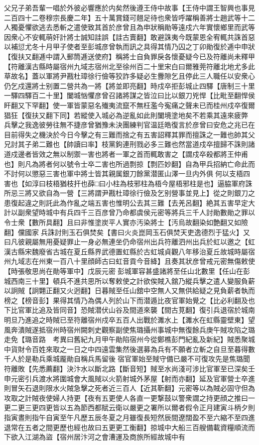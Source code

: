 父兄子弟吾輩一唱於外彼必響應於内矣然後遵王侍中故事【王侍中謂王智興也事見二百四十二卷穆宗長慶二年】五十萬賞錢可翹足待也衆皆呼躍稱善將士趙武等十二人獨憂懼欲逃去悉斬之遣使致其首於彦曾且為申狀稱勛等遠戍六年實懷鄉里而武等因衆心不安輒萌奸計將士誠知詿誤【詿古賣翻】敢避誅夷今既蒙恩全宥輒共誅首惡以補愆尤冬十月甲子使者至彭城彦曾執而訊之具得其情乃囚之丁卯勛復於逓中申狀【復扶又翻逓中謂入郵筒逓送使府】稱將士自負罪戾各懷憂疑今已及符離尚未釋甲【符離漢古縣時屬宿州九域志宿州北至徐州百二十里宋白曰爾雅莞符離北地尤多此草故名】蓋以軍將尹戡杜璋徐行儉等狡詐多疑必生釁隙乞且停此三人職任以安衆心仍乞戍還將士别置二營共為一將【將並即亮翻】時戍卒拒彭城止四驛【唐制三十里一驛四驛百二十里】闔城忷懼彦曾召諸將謀之皆泣曰比以銀刀兇悍【比毗至翻悍侯盰翻又下罕翻】使一軍皆蒙惡名殱夷流竄不無枉濫今寃痛之聲未已而桂州戍卒復爾猖狂【復扶又翻下同】若縱使入城必為逆亂如此則闔境塗地矣不若乘其遠來疲弊兵擊之我逸彼勞往無不捷彦曾猶豫未決團練判官温廷皓復言於彦曾曰安危之兆已在目前得失之機決於今日今擊之有三難而捨之有五害詔釋其罪而擅誅之一難也帥其父兄討其子弟二難也【帥讀曰率】枝黨鉤連刑戮必多三難也然當道戍卒擅歸不誅則諸道戍邊者皆效之無以制禦一害也將者一軍之首而輒敢害之【謂戍卒殺都將王仲甫也】則凡為將者何以號令士卒二害也所過剽掠【剽匹妙翻】自為甲兵招納亡命此而不討何以懲惡三害也軍中將士皆其親属銀刀餘黨潜匿山澤一旦内外俱何以支梧四害也【如淳曰枝梧猶枝扞也薛□曰小柱為枝邪柱為梧今屋梧邪柱是也】逼脇軍府誅所忌三將又欲自為一營【三將謂尹戡杜璋徐行儉及乞别營事並見上】從之則銀刀之患復起違之則託此為作亂之端五害也惟明公去其三難【去羌呂翻】絶其五害早定大計以副衆望時城中有兵四千三百彦曾乃命都虞侯元密等將兵三千人討勛數勛之罪以令士衆【數所具翻】且曰非惟塗炭平人實亦汚染將士【汚烏故翻染如艶翻又如險翻】儻國家兵誅討則玉石俱焚矣【書曰火炎崑岡玉石俱焚天吏逸德烈于猛火】又曰凡彼親屬無用憂疑罪止一身必無連坐仍命宿州出兵符離泗州出兵於虹以邀之【虹漢古縣宋魏廢省古城在夏丘縣界武德置虹縣於古虹城貞觀八年移治夏丘故城時屬宿州九域志在州東一百八十里顔師古曰虹音貢今音絳】且奏其狀彦曾戒元密無傷敕使【時張敬思尚在勛等軍中】戊辰元密彭城軍容甚盛諸將至任山北數里【任山在彭城西南三十里】頓兵不進共思所以奪敕使之計欲俟賊入舘乃縱兵擊之遣人變服負薪以詗賊【詗翾正翻又火迥翻】日暮賊至任山舘中空無人又無供給疑之見負薪者執而榜之【榜音彭】果得其情乃為偶人列於山下而潜遁比夜官軍始覺之【比必利翻及也下比官軍比追及皆同音】恐賊潜伏山谷及間道來襲【間古莧翻】復引兵退宿於城南明旦乃進追之時賊已至符離宿州戍卒五百人出戰於濉水上【濉水在虹縣靈壁東】望風奔潰賊遂抵宿州時宿州闕刺史觀察副使焦璐攝州事城中無復餘兵庚午賊攻陷之璐走免【璐音路　考異曰舊紀九月甲午勛陷宿州今從鄭樵彭門紀亂及新紀】賊悉聚城中貨財令百姓來取之一日之中四遠雲集然後選募為兵有不願者立斬之自旦至暮得數千人於是勒兵乘城龎勛自稱兵馬留後宿官軍始至賊守備已嚴不可復攻先是焦璐聞符離敗【先悉薦翻】決汴水以斷北路【斷音短】賊至水尚淺可涉比官軍至已深矣壬申元密引兵渡水將圍城會大風賊以火箭射城外茅屋【射而亦翻】延及官軍營士卒進則冒矢石退則限水火賊急擊之死者近三百人【近其靳翻】元密等以為賊必固守但為攻取之計賊夜使婦人持更【夜有五更使人各直一更撃鼓以警衆謂之持更顔之推曰一更二更三更四更皆以五為節西都賦云衛以嚴更之署所以爾者假令正月建寅斗柄夕則指寅晝則指午自寅至午凡歷五辰冬夏之月雖復長短然辰間遼闊盈不至六縮不至四進退常在五者之間更歷也經也故曰五更更工衡翻】掠城中大船三百艘備載資糧順流而下欲入江湖為盜【宿州居汴河之會漕運及商旅所經故城中有